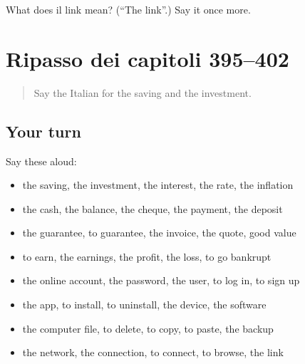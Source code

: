 \begin{tcolorbox}[breakable,colback=teal!4,colframe=teal!35!black,title={Before you move on}]
What does il link mean? (\textquotedblleft{}The link\textquotedblright{}.) Say it once more.
\end{tcolorbox}
\section[(dialogue)]{Ripasso dei capitoli 395–402}

\label{lesson:IT-R402-ripasso-395-402}



\begin{quote}
Say the Italian for the saving and the investment.
\end{quote}

\subsection*{Your turn}
Say these aloud:

\begin{itemize}
\raggedright
  \item the saving, the investment, the interest, the rate, the inflation
  \item the cash, the balance, the cheque, the payment, the deposit
  \item the guarantee, to guarantee, the invoice, the quote, good value
  \item to earn, the earnings, the profit, the loss, to go bankrupt
  \item the online account, the password, the user, to log in, to sign up
  \item the app, to install, to uninstall, the device, the software
  \item the computer file, to delete, to copy, to paste, the backup
  \item the network, the connection, to connect, to browse, the link
\end{itemize}

